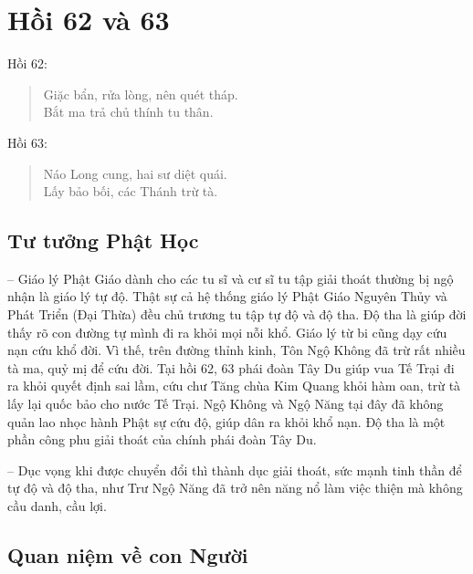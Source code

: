 \chapter{Hồi 62 và 63} %
\label{cha:hoi_62_63}

Hồi 62:

\begin{verse}
\begin{itshape}
Giặc bẩn, rửa lòng, nên quét tháp.\\
Bắt ma trả chủ thính tu thân.
\end{itshape}
\end{verse}

Hồi 63:

\begin{verse}
\begin{itshape}
Náo Long cung, hai sư diệt quái.\\
Lấy bảo bối, các Thánh trừ tà.
\end{itshape}
\end{verse}

\section{Tư tưởng Phật Học} %
\label{sec:62_63_phat_hoc}

-- Giáo lý Phật Giáo dành cho các tu sĩ và cư sĩ tu tập giải thoát thường bị ngộ nhận là giáo lý tự độ. Thật sự cả hệ thống giáo lý Phật Giáo Nguyên Thủy và Phát Triển (Đại Thừa) đều chủ trương tu tập tự độ và độ tha. Độ tha là giúp đời thấy rõ con đường tự mình đi ra khỏi mọi nỗi khổ. Giáo lý từ bi cũng dạy cứu nạn cứu khổ đời. Vì thế, trên đường thỉnh kinh, Tôn Ngộ Không đã trừ rất nhiều tà ma, quỷ mị để cứu đời. Tại hồi 62, 63 phái đoàn Tây Du giúp vua Tế Trại đi ra khỏi quyết định sai lầm, cứu chư Tăng chùa Kim Quang khỏi hàm oan, trừ tà lấy lại quốc bảo cho nước Tế Trại. Ngộ Không và Ngộ Năng tại đây đã không quản lao nhọc hành Phật sự cứu độ, giúp dân ra khỏi khổ nạn. Độ tha là một phần công phu giải thoát của chính phái đoàn Tây Du.

-- Dục vọng khi được chuyển đổi thì thành dục giải thoát, sức mạnh tinh thần để tự độ và độ tha, như Trư Ngộ Năng đã trở nên năng nổ làm việc thiện mà không cầu danh, cầu lợi.

\section{Quan niệm về con Người} %
\label{sec:62_63_con_nguoi}

